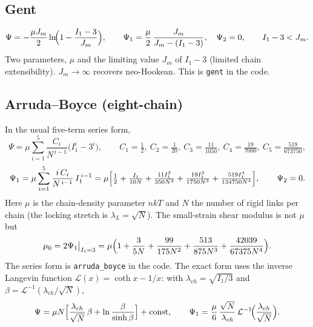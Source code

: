 \documentclass[11pt]{article}
\newcommand{\Ione}{I_1}
\newcommand{\Pone}{\Psi_{1}}
\newcommand{\Ptwo}{\Psi_{2}}
\newcommand{\code}[1]{{\frenchspacing\texttt{#1}}}
\begin{document}
\subsection{Gent}
\begin{equation}
  \Psi = -\frac{\mu J_m}{2}\ln\!\Bigl(1 - \frac{\Ione - 3}{J_m}\Bigr), \qquad
  \Pone = \frac{\mu}{2}\,\frac{J_m}{J_m - (\Ione - 3)}, \quad \Ptwo = 0,
  \qquad \Ione - 3 < J_m .
\end{equation}
Two parameters, $\mu$ and the limiting value $J_m$ of $\Ione - 3$
(limited chain extensibility).  $J_m \to \infty$ recovers neo-Hookean.  This
is \code{gent} in the code.

\subsection{Arruda--Boyce (eight-chain)}
In the usual five-term series form,
\begin{equation}
  \Psi = \mu\sum_{i=1}^{5}\frac{C_i}{N^{\,i-1}}\bigl(\Ione^i - 3^i\bigr), \qquad
  C_1 = \tfrac12,\ C_2 = \tfrac{1}{20},\ C_3 = \tfrac{11}{1050},\
  C_4 = \tfrac{19}{7000},\ C_5 = \tfrac{519}{673750},
\end{equation}
\begin{equation}
  \Pone = \mu\sum_{i=1}^{5}\frac{i\,C_i}{N^{\,i-1}}\,\Ione^{\,i-1}
        = \mu\Bigl[\tfrac12 + \tfrac{\Ione}{10N} + \tfrac{11\Ione^2}{350N^2}
          + \tfrac{19\Ione^3}{1750N^3} + \tfrac{519\Ione^4}{134750N^4}\Bigr],
  \qquad \Ptwo = 0 .
\end{equation}
Here $\mu$ is the chain-density parameter $nkT$ and $N$ the number of
rigid links per chain (the locking stretch is $\lambda_L = \sqrt N$).  The
small-strain shear modulus is not $\mu$ but
\begin{equation}
  \mu_0 = 2\Pone\big|_{\Ione = 3}
  = \mu\Bigl(1 + \frac{3}{5N} + \frac{99}{175N^2} + \frac{513}{875N^3} + \frac{42039}{67375N^4}\Bigr).
  \label{eq:ab_mu0}
\end{equation}
The series form is \code{arruda\_boyce} in the code.  The exact form uses the
inverse Langevin function
$\mathcal L(x) = \coth x - 1/x$: with $\lambda_{ch} = \sqrt{\Ione/3}$ and
$\beta = \mathcal L^{-1}(\lambda_{ch}/\sqrt N)$,
\begin{equation}
  \Psi = \mu N\Bigl[\frac{\lambda_{ch}}{\sqrt N}\,\beta + \ln\frac{\beta}{\sinh\beta}\Bigr] + \text{const},
  \qquad
  \Pone = \frac{\mu}{6}\,\frac{\sqrt N}{\lambda_{ch}}\,\mathcal L^{-1}\!\Bigl(\frac{\lambda_{ch}}{\sqrt N}\Bigr).
\end{equation}
\end{document}
